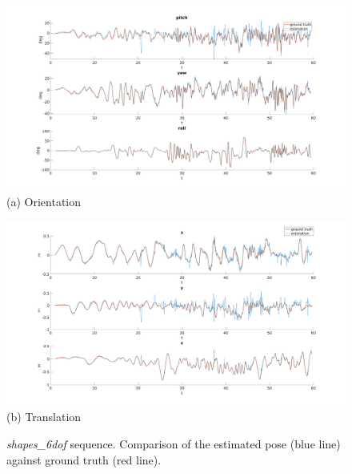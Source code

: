 \begin{figure}
  \begin{minipage}[t]{\textwidth}
    \centering \includegraphics[trim={5cm 0cm 5cm 0cm},clip,width =
    \textwidth]{images/shapes_6dof_rotation.png} (a) Orientation
  \end{minipage}
  \hfill
  \begin{minipage}[t]{\textwidth}
    \centering \includegraphics[trim={5cm 0cm 5cm 0cm},clip,width =
    \textwidth]{images/shapes_6dof_translation.png} (b) Translation
  \end{minipage}
  \hfill
  \caption{\textit{shapes\_6dof} sequence. Comparison of the estimated
    pose (blue line) against ground truth (red line).}
  \label{fig:shapes_6dof_pose}
\end{figure}

